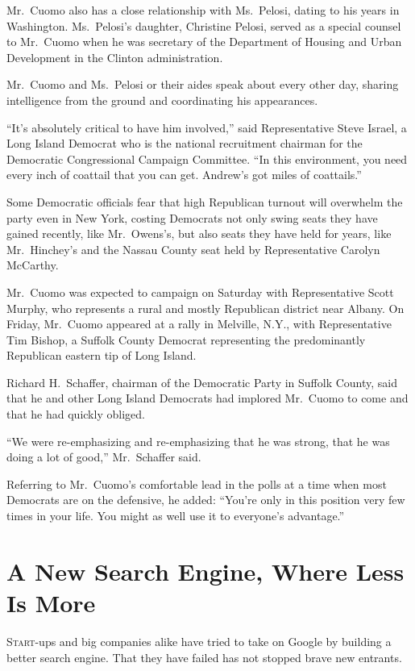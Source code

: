 ﻿\documentclass[12pt]{article}
\begin{document}
Mr.~Cuomo also has a close relationship with Ms.~Pelosi, dating to his years in Washington.
Ms.~Pelosi's daughter, Christine Pelosi, served as a special counsel to Mr.~Cuomo when he was
secretary of the Department of Housing and Urban Development in the Clinton administration.

Mr.~Cuomo and Ms.~Pelosi or their aides speak about every other day, sharing intelligence from the
ground and coordinating his appearances.

``It's absolutely critical to have him involved,'' said Representative Steve Israel, a Long Island
Democrat who is the national recruitment chairman for the Democratic Congressional Campaign
Committee. ``In this environment, you need every inch of coattail that you can get. Andrew's got
miles of coattails.''

Some Democratic officials fear that high Republican turnout will overwhelm the party even in New
York, costing Democrats not only swing seats they have gained recently, like Mr.~Owens's, but also
seats they have held for years, like Mr.~Hinchey's and the Nassau County seat held by Representative
Carolyn McCarthy.

Mr.~Cuomo was expected to campaign on Saturday with Representative Scott Murphy, who represents a
rural and mostly Republican district near Albany. On Friday, Mr.~Cuomo appeared at a rally in
Melville, N.Y., with Representative Tim Bishop, a Suffolk County Democrat representing the
predominantly Republican eastern tip of Long Island.

Richard H.~Schaffer, chairman of the Democratic Party in Suffolk County, said that he and other Long
Island Democrats had implored Mr.~Cuomo to come and that he had quickly obliged.

``We were re-emphasizing and re-emphasizing that he was strong, that he was doing a lot of good,''
Mr.~Schaffer said.

Referring to Mr.~Cuomo's comfortable lead in the polls at a time when most Democrats are on the
defensive, he added: ``You're only in this position very few times in your life. You might as well
use it to everyone's advantage.''

\section{A New Search Engine, Where Less Is More}

\lettrine{S}{tart}-ups and big companies alike have tried to take on Google
by building a better search engine. That they have failed has not stopped brave new entrants.
\end{document}
